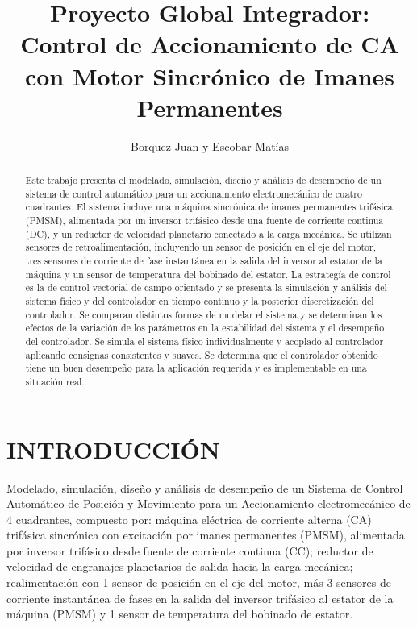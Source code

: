 \documentclass[a4paper, 10pt, onecolumn,journal]{ieeeconf}
\title{\LARGE \bf
Proyecto Global Integrador: Control de Accionamiento de CA con
Motor Sincrónico de Imanes Permanentes
}
\author{Borquez Juan y Escobar Matías}
\begin{document}
\maketitle
\thispagestyle{empty}
\pagestyle{fancy}

\begin{abstract}
	Este trabajo presenta el modelado, simulación, diseño y análisis de desempeño de un sistema de control automático para un accionamiento electromecánico de cuatro cuadrantes. El sistema incluye una máquina sincrónica de imanes permanentes trifásica (PMSM), alimentada por un inversor trifásico desde una fuente de corriente continua (DC), y un reductor de velocidad planetario conectado a la carga mecánica. Se utilizan sensores de retroalimentación, incluyendo un sensor de posición en el eje del motor, tres sensores de corriente de fase instantánea en la salida del inversor al estator de la máquina y un sensor de temperatura del bobinado del estator.
	La estrategía de control es la de control vectorial de campo orientado y se presenta la simulación y análisis del sistema físico y del controlador en tiempo continuo y la posterior discretización del controlador.
	Se comparan distintos formas de modelar el sistema y se determinan los efectos de la variación de los parámetros en la estabilidad del sistema y el desempeño del controlador. Se simula el sistema físico individualmente y acoplado al controlador aplicando consignas consistentes y suaves.
	Se determina que el controlador obtenido tiene un buen desempeño para la aplicación requerida y es implementable en una situación real.
\end{abstract}

\section{INTRODUCCIÓN}
Modelado, simulación, diseño y análisis de desempeño de un Sistema de Control Automático de Posición y Movimiento para un Accionamiento electromecánico de 4 cuadrantes, compuesto por: máquina eléctrica de corriente alterna (CA) trifásica sincrónica con excitación por imanes permanentes (PMSM), alimentada por inversor trifásico desde fuente de corriente continua (CC); reductor de velocidad de engranajes planetarios de salida hacia la carga mecánica; realimentación con 1 sensor de posición en el eje del motor, más 3 sensores de corriente instantánea de fases en la salida del inversor trifásico al estator de la máquina (PMSM) y 1 sensor de temperatura del bobinado de estator.
\end{document}
